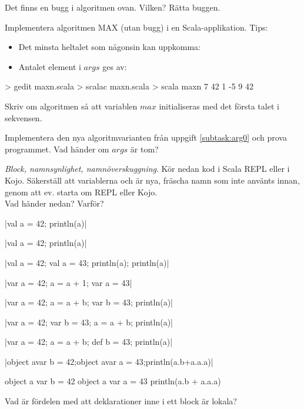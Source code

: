 \Subtask\Pen Det finns en bugg i algoritmen ovan. Vilken? Rätta buggen.

\Subtask Implementera algoritmen MAX (utan bugg) i en Scala-applikation. Tips:
\begin{itemize}[noitemsep, nolistsep]
\item Det minsta heltalet som någonsin kan uppkomma: 
\item Antalet element i $args$ ges av: 
\end{itemize}

\begin{REPL}
> gedit maxn.scala
> scalac maxn.scala
> scala maxn 7 42 1 -5 9
42
\end{REPL}

\Subtask\Pen \label{subtask:arg0} Skriv om algoritmen så att variablen $max$ initialiseras med det första talet i sekvensen. 

\Subtask Implementera den nya algoritmvarianten från uppgift \ref{subtask:arg0} och prova programmet. Vad händer om $args$ är tom?

\Task \emph{Block, namnsynlighet, namnöverskuggning}. Kör nedan kod i Scala REPL eller i Kojo. Säkerställ att variablerna  och  är nya, fräscha namn som inte använts innan, genom att ev. starta om REPL eller Kojo. \\ Vad händer nedan? Varför?

\Subtask \code|{val a = 42; println(a)}|

\Subtask \code|{val a = 42}; println(a)|

\Subtask \code|{val a = 42; {val a = 43; println(a)}; println(a)}|

\Subtask \code|{var a = 42; {a = a + 1}; var a = 43}|

\Subtask \code|{var a = 42; {a = a + b; var b = 43}; println(a)}|

\Subtask \code|{var a = 42; {var b = 43; a = a + b}; println(a)}|

\Subtask \code|{var a = 42; {a = a + b; def b = 43}; println(a)}|

\Subtask \code|{object a{var b = 42;object a{var a = 43}};println(a.b+a.a.a)}|

\Subtask 

\begin{Code}
{
  object a {
    var b = 42
    object a {
      var a = 43
    }
  }
  println(a.b + a.a.a)
}
\end{Code}

\Subtask Vad är fördelen med att deklarationer inne i ett block är lokala?



